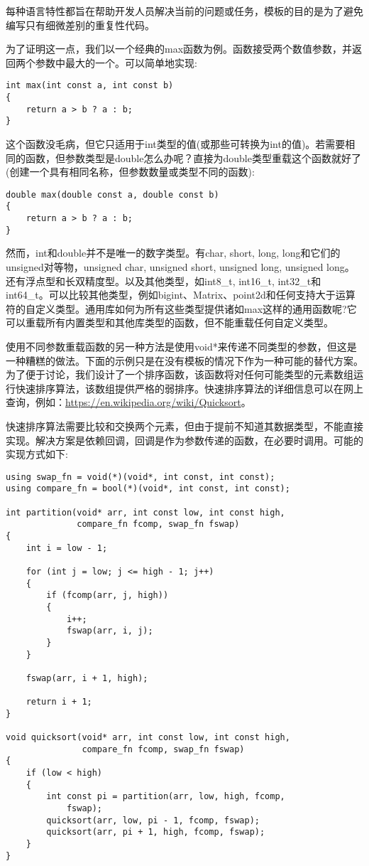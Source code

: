 每种语言特性都旨在帮助开发人员解决当前的问题或任务，模板的目的是为了避免编写只有细微差别的重复性代码。

为了证明这一点，我们以一个经典的max函数为例。函数接受两个数值参数，并返回两个参数中最大的一个。可以简单地实现:

\begin{lstlisting}[style=styleCXX]
int max(int const a, int const b)
{
	return a > b ? a : b;
}
\end{lstlisting}

这个函数没毛病，但它只适用于int类型的值(或那些可转换为int的值)。若需要相同的函数，但参数类型是double怎么办呢？直接为double类型重载这个函数就好了(创建一个具有相同名称，但参数数量或类型不同的函数):

\begin{lstlisting}[style=styleCXX]
double max(double const a, double const b)
{
	return a > b ? a : b;
}
\end{lstlisting}

然而，int和double并不是唯一的数字类型。有char, short, long, long和它们的unsigned对等物，unsigned char, unsigned short, unsigned long, unsigned long。还有浮点型和长双精度型。以及其他类型，如int8\_t, int16\_t, int32\_t和int64\_t。可以比较其他类型，例如bigint、Matrix、point2d和任何支持大于运算符的自定义类型。通用库如何为所有这些类型提供诸如max这样的通用函数呢?它可以重载所有内置类型和其他库类型的函数，但不能重载任何自定义类型。

使用不同参数重载函数的另一种方法是使用void*来传递不同类型的参数，但这是一种糟糕的做法。下面的示例只是在没有模板的情况下作为一种可能的替代方案。为了便于讨论，我们设计了一个排序函数，该函数将对任何可能类型的元素数组运行快速排序算法，该数组提供严格的弱排序。快速排序算法的详细信息可以在网上查询，例如：\url{https://en.wikipedia.org/wiki/Quicksort}。

快速排序算法需要比较和交换两个元素，但由于提前不知道其数据类型，不能直接实现。解决方案是依赖回调，回调是作为参数传递的函数，在必要时调用。可能的实现方式如下:

\begin{lstlisting}[style=styleCXX]
using swap_fn = void(*)(void*, int const, int const);
using compare_fn = bool(*)(void*, int const, int const);

int partition(void* arr, int const low, int const high,
			  compare_fn fcomp, swap_fn fswap)
{
	int i = low - 1;
	
	for (int j = low; j <= high - 1; j++)
	{
		if (fcomp(arr, j, high))
		{
			i++;
			fswap(arr, i, j);
		}
	}

	fswap(arr, i + 1, high);
	
	return i + 1;
}

void quicksort(void* arr, int const low, int const high,
			   compare_fn fcomp, swap_fn fswap)
{
	if (low < high)
	{
		int const pi = partition(arr, low, high, fcomp,
			fswap);
		quicksort(arr, low, pi - 1, fcomp, fswap);
		quicksort(arr, pi + 1, high, fcomp, fswap);
	}
}
\end{lstlisting}

